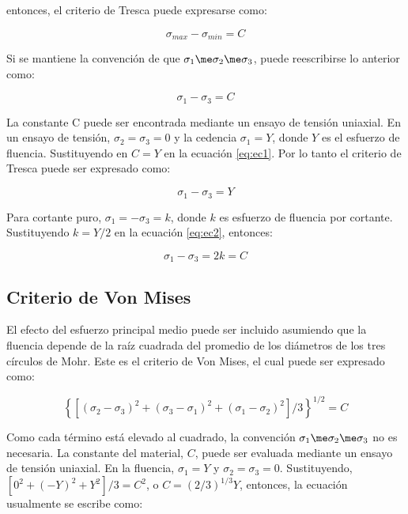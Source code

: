 entonces, el criterio de Tresca puede expresarse como:

\begin{equation}
\sigma_{max} - \sigma_{min} = C
\end{equation}

Si se mantiene la convención de que $ \sigma_1 \me \sigma_2 \me \sigma_3 $, puede reescribirse lo anterior como:

\begin{equation}\label{eq:ec1}
\sigma_1 - \sigma_3 = C
\end{equation}

La constante C puede ser encontrada mediante un ensayo de tensión uniaxial. En un ensayo de tensión, 
$\sigma_2 = \sigma_3 = 0$ y la cedencia $\sigma_1 = Y$, donde $Y$ es el esfuerzo de fluencia. Sustituyendo 
en $C=Y$ en la ecuación \ref{eq:ec1}. Por lo tanto el criterio de Tresca puede ser expresado como:

\begin{equation}\label{eq:ec2}
\sigma_1 - \sigma_3 = Y
\end{equation}

Para cortante puro, $ \sigma_1 = -\sigma_3 = k$, donde $k$ es esfuerzo de fluencia por cortante. Sustituyendo 
$ k = Y/2 $ en la ecuación \ref{eq:ec2}, entonces:

\begin{equation}
\sigma_1 - \sigma_3 = 2k = C
\end{equation}

\subsection{Criterio de Von Mises}

El efecto del esfuerzo principal medio puede ser incluido asumiendo que la fluencia depende de la raíz cuadrada 
del promedio de los diámetros de los tres círculos de Mohr. Este es el criterio de Von Mises, el cual puede ser 
expresado como:

\begin{equation} \label{eq:ec3}
\left\{ [(\sigma_2-\sigma_3)^2 + (\sigma_3-\sigma_1 )^2 + (\sigma_1-\sigma_2 )^2]/3 \right\}^{1/2} = C
\end{equation}

Como cada término está elevado al cuadrado, la convención $\sigma_1 \me \sigma_2 \me \sigma_3$ no es necesaria. 
La constante del material, $C$, puede ser evaluada mediante un ensayo de tensión uniaxial. En la fluencia, 
$\sigma_1 = Y$ y $\sigma_2 = \sigma_3 = 0$. Sustituyendo, $[0^2 + (-Y)^2 + Y^2]/3 = C^2$, o 
$C = (2/3)^{1/3} Y $, entonces, la ecuación usualmente se escribe como:

